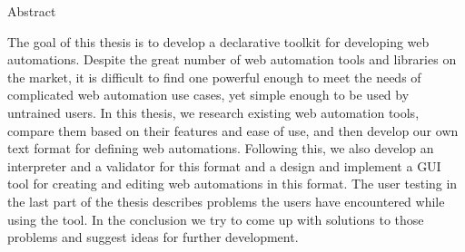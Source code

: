 \documentclass[12pt]{report}
\begin{document}

Abstract 

The goal of this thesis is to develop a declarative toolkit for developing web automations.
Despite the great number of web automation tools and libraries on the market, it is difficult 
to find one powerful enough to meet the needs of complicated web automation use cases, yet simple enough 
to be used by untrained users. 
In this thesis, we research existing web automation tools, compare them
based on their features and ease of use, and then develop our own text format for defining web automations. 
Following this, we also develop an interpreter and a validator for this format and a design and implement 
a GUI tool for creating and editing web automations in this format. 
The user testing in the last part of the thesis describes problems the users have encountered while using
the tool. In the conclusion we try to come up with solutions to those problems and suggest ideas for further 
development.
\end{document}

